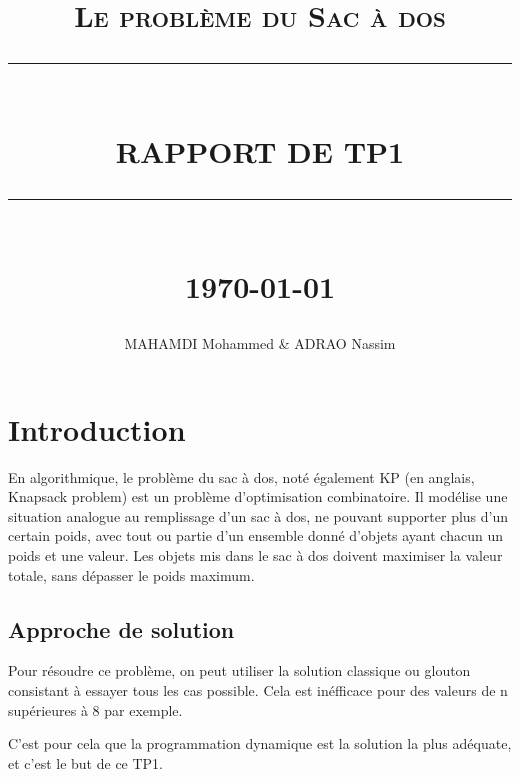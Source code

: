 \documentclass[12pt]{report}
\newcommand{\HRule}[1]{\rule{\linewidth}{#1}}
\begin{document}
	\renewcommand{\contentsname}{Table des Matières}
\renewcommand{\listfigurename}{Table des Figures}

	\author{MAHAMDI Mohammed & ADRAO Nassim}        
	\date{} 
	\title{  \textsc{ Le problème du Sac à dos}
		\\ [2.0cm]
		\HRule{0.5pt} \\
		\LARGE \textbf{\uppercase{Rapport de TP1 }}
		\HRule{2pt} \\ [0.5cm]
		\normalsize \today \vspace*{5\baselineskip}}
	\maketitle
	\tableofcontents
\newpage
\listoffigures 
	\newpage
	\sectionfont{\scshape}
	
	\chapter{Introduction}
	 En algorithmique, le problème du sac à dos, noté également KP (en anglais, Knapsack problem) est un problème d'optimisation combinatoire. Il modélise une situation analogue au remplissage d'un sac à dos, ne pouvant supporter plus d'un certain poids, avec tout ou partie d'un ensemble donné d'objets ayant chacun un poids et une valeur. Les objets mis dans le sac à dos doivent maximiser la valeur totale, sans dépasser le poids maximum.
	\section{Approche de solution}
\par{}
	Pour résoudre ce problème, on peut utiliser la solution classique ou glouton consistant à essayer tous les cas possible. Cela est inéfficace pour des valeurs de n supérieures à 8 par exemple.
\par{}
	C'est pour cela que la programmation dynamique est la solution la plus adéquate, et c'est le but de ce TP1.
	
\end{document}

